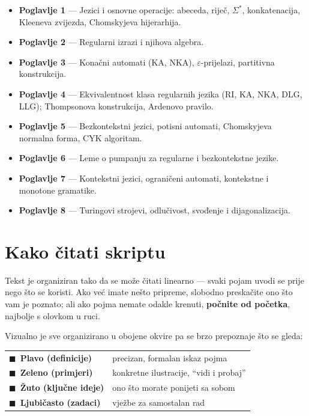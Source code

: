 \documentclass[12pt,a4paper]{report}
\newcommand{\Sig}{\Sigma}
\newcommand{\eps}{\varepsilon}
\begin{document}
\begin{kljucno}
\begin{itemize}[itemsep=2pt]
  \item \textbf{Poglavlje 1} --- Jezici i osnovne operacije: abeceda,
        riječ, $\Sig^*$, konkatenacija, Kleeneva zvijezda, Chomskyjeva
        hijerarhija.
  \item \textbf{Poglavlje 2} --- Regularni izrazi i njihova algebra.
  \item \textbf{Poglavlje 3} --- Konačni automati (KA, NKA),
        $\eps$-prijelazi, partitivna konstrukcija.
  \item \textbf{Poglavlje 4} --- Ekvivalentnost klasa regularnih jezika
        (RI, KA, NKA, DLG, LLG); Thompsonova konstrukcija, Ardenovo pravilo.
  \item \textbf{Poglavlje 5} --- Bezkontekstni jezici, potisni automati,
        Chomskyjeva normalna forma, CYK algoritam.
  \item \textbf{Poglavlje 6} --- Leme o pumpanju za regularne i
        bezkontekstne jezike.
  \item \textbf{Poglavlje 7} --- Kontekstni jezici, ograničeni automati,
        kontekstne i monotone gramatike.
  \item \textbf{Poglavlje 8} --- Turingovi strojevi, odlučivost, svođenje
        i dijagonalizacija.
\end{itemize}
\end{kljucno}

\section*{Kako čitati skriptu}

Tekst je organiziran tako da se može čitati linearno --- svaki pojam
uvodi se prije nego što se koristi. Ako već imate nešto pripreme,
slobodno preskačite ono što vam je poznato; ali ako pojma nemate odakle
krenuti, \textbf{počnite od početka}, najbolje s olovkom u ruci.

Vizualno je sve organizirano u obojene okvire pa se brzo prepoznaje
što se gleda:

\medskip
\noindent
\begin{tabular}{ll}
  \textcolor{defborder}{$\blacksquare$}~\textbf{Plavo (definicije)}
    & precizan, formalan iskaz pojma \\
  \textcolor{exborder}{$\blacksquare$}~\textbf{Zeleno (primjeri)}
    & konkretne ilustracije, ``vidi i probaj'' \\
  \textcolor{keyborder}{$\blacksquare$}~\textbf{Žuto (ključne ideje)}
    & ono što morate ponijeti sa sobom \\
  \textcolor{taskborder}{$\blacksquare$}~\textbf{Ljubičasto (zadaci)}
    & vježbe za samostalan rad \\
\end{tabular}
\end{document}
